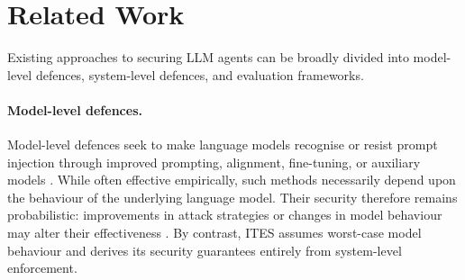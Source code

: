\documentclass{article}
\begin{document}
\section{Related Work}
\label{sec:related}

Existing approaches to securing LLM agents can be broadly divided into
model-level defences, system-level defences, and evaluation frameworks.

\paragraph{Model-level defences.}
Model-level defences seek to make language models recognise or resist prompt
injection through improved prompting, alignment, fine-tuning, or auxiliary
models
\citep{struq2024,spotlighting2024,chen2025defendingpromptinjectiondefensivetokens,chen2025secalign,liu2025datasentinel}.
While often effective empirically, such methods necessarily depend upon the
behaviour of the underlying language model. Their security therefore remains
probabilistic: improvements in attack strategies or changes in model behaviour
may alter their effectiveness
\citep{pasquini2024neuralexec,choudhary2025detect,shao2025poisoning,yang2025checkpointgcg,jia2025criticalevaluation}.
By contrast, ITES assumes worst-case model behaviour and derives its security
guarantees entirely from system-level enforcement.
\end{document}
